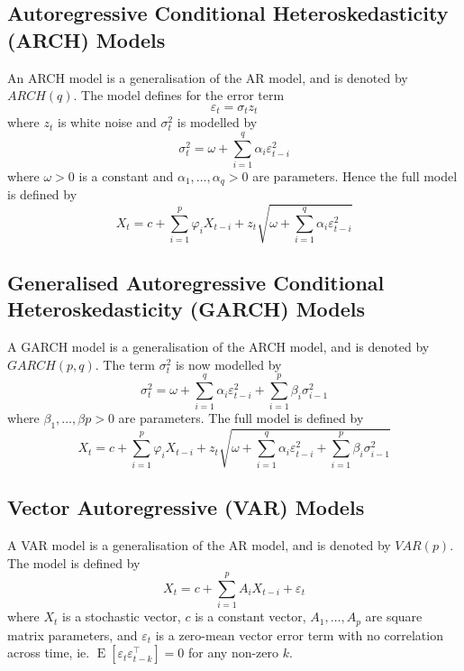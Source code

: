 \documentclass[11pt]{report} %
\begin{document}
\subsection{Autoregressive Conditional Heteroskedasticity (ARCH) Models}
An ARCH model is a generalisation of the AR model, and is denoted by $ARCH\left(q\right)$. The model defines for the error term
\begin{equation}
\varepsilon_{t} = \sigma_{t}z_{t}
\end{equation}
where $z_{t}$ is white noise and $\sigma^{2}_{t}$ is modelled by
\begin{equation}
\sigma^{2}_{t} = \omega + \sum_{i = 1}^{q}\alpha_{i}\varepsilon^{2}_{t - i}
\end{equation}
where $\omega > 0$ is a constant and $\alpha_{1}, \dots, \alpha_{q} > 0$ are parameters. Hence the full model is defined by
\begin{equation}
X_{t} = c + \sum_{i = 1}^{p}\varphi_{i}X_{t - i} + z_{t}\sqrt{\omega + \sum_{i = 1}^{q}\alpha_{i}\varepsilon^{2}_{t - i}}
\end{equation}

\subsection{Generalised Autoregressive Conditional Heteroskedasticity (GARCH) Models}
A GARCH model is a generalisation of the ARCH model, and is denoted by $GARCH\left(p, q\right)$. The term $\sigma^{2}_{t}$ is now modelled by
\begin{equation}
\sigma^{2}_{t} = \omega + \sum_{i = 1}^{q}\alpha_{i}\varepsilon^{2}_{t - i} + \sum_{i = 1}^{p}\beta_{i}\sigma^{2}_{i - 1}
\end{equation}
where $\beta_{1}, \dots, \beta{p} > 0$ are parameters. The full model is defined by
\begin{equation}
X_{t} = c + \sum_{i = 1}^{p}\varphi_{i}X_{t - i} + z_{t}\sqrt{\omega + \sum_{i = 1}^{q}\alpha_{i}\varepsilon^{2}_{t - i} + \sum_{i = 1}^{p}\beta_{i}\sigma^{2}_{i - 1}}
\end{equation}

\subsection{Vector Autoregressive (VAR) Models}
A VAR model is a generalisation of the AR model, and is denoted by  $VAR\left(p\right)$. The model is defined by
\begin{equation}
X_{t} = c + \sum_{i = 1}^{p}A_{i}X_{t - i} + \varepsilon_{t}
\end{equation}
where $X_{t}$ is a stochastic vector, $c$ is a constant vector, $A_{1}, \dots, A_{p}$ are square matrix parameters, and $\varepsilon_{t}$ is a zero-mean vector error term with no correlation across time, ie. $\operatorname{E}\left[\varepsilon_{t}\varepsilon_{t - k}^{\top}\right] = 0$ for any non-zero $k$.
\end{document}
